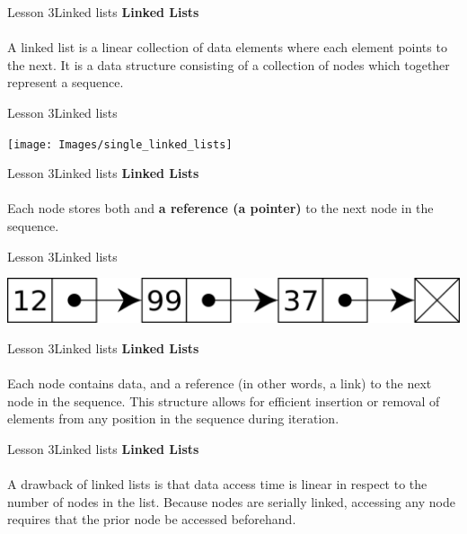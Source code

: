 \documentclass[aspectratio=1610]{beamer}
\begin{document}
\begin{frame}{Lesson 3}{Linked lists}
\LARGE
\textbf{Linked Lists}\\~\\
A linked list is a linear collection of data elements where each element points
to the next. It is a data structure consisting of a collection of nodes which
together represent a sequence.
\end{frame}


\begin{frame}{Lesson 3}{Linked lists}
\begin{center}
\texttt{[image: Images/single\_linked\_lists]}
\end{center}
\end{frame}



\begin{frame}{Lesson 3}{Linked lists}
\LARGE
\textbf{Linked Lists}\\~\\
Each node stores both  and \textbf{a reference (a pointer)} to the
next node in the sequence.
\end{frame}


\begin{frame}{Lesson 3}{Linked lists}
\begin{center}
\includegraphics[scale=0.10]{Images/linked-list}
\end{center}
\end{frame}



\begin{frame}{Lesson 3}{Linked lists}
\LARGE
\textbf{Linked Lists}\\~\\
Each node contains data, and a reference (in other words, a link) to the next
node in the sequence. This structure allows for efficient insertion or removal of
elements from any position in the sequence during iteration.
\end{frame}



\begin{frame}{Lesson 3}{Linked lists}
\LARGE
\textbf{Linked Lists}\\~\\
A drawback of linked lists is that data access time is linear in respect to the
number of nodes in the list. Because nodes are serially linked, accessing any
node requires that the prior node be accessed beforehand.
\end{frame}
\end{document}
